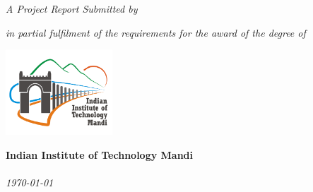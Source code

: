 \begin{titlepage}
\begin{center}
\begin{flushright}
\Huge{\textbf{{\ttitle}}}
\end{flushright}
\vfill
\begin{flushright}
\large{\emph{A Project Report Submitted by}}\\
\huge{\textbf{\authorname}}
\end{flushright}
\vfill
\begin{flushright}
\large{{\emph{in partial fulfilment of the requirements for the award of the degree of}}}\\
\huge{\textbf{\degree}}
\end{flushright}
\vfill
\includegraphics[width=0.3\textwidth,right]{IITManlogo.jpg}
\begin{flushright}
\Large{\textbf{Indian Institute of Technology Mandi}}\\
\Large{\textbf{\deptname}}\\
\Large{\emph{\monthyeardate\today}}
\end{flushright}


  

 
\end{center}
\end{titlepage}
